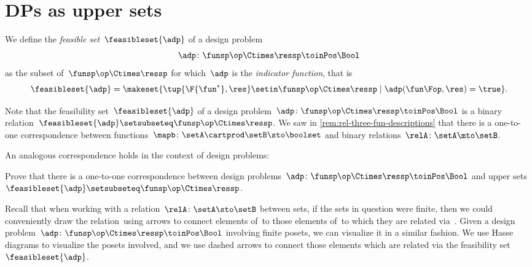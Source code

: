 \section{DPs as upper sets}

\begin{definition}
    \label{def:dp-feasible-set}
    We define the \emph{feasible set}~$\feasibleset{\adp}$ of a design problem
    \begin{equation}
        \label{eq:generic-design-prob}
        \adp\colon \funsp\op \Ctimes \ressp \toinPos \Bool
    \end{equation}
    as the subset of~$\funsp \op\Ctimes \ressp$ for which~$\adp$ is the \emph{indicator function}, that is%
    \begin{equation}
        \label{eq:design-prob-as-upper-set}
        \feasibleset{\adp} = \makeset{ \tup{\F{\fun^*},\res} \setin \funsp \op\Ctimes \ressp  \mid %
            \adp(\fun\Fop, \res) = \true %
        }.
    \end{equation}
\end{definition}

Note that the feasibility set~$\feasibleset{\adp}$ of a design problem~$\adp \colon \funsp \op \Ctimes \ressp\toinPos \Bool$ is a binary relation~$\feasibleset{\adp} \setsubseteq \funsp\op \Ctimes \ressp$.
We saw in \cref{rem:rel-three-fun-descriptions} that there is a one-to-one correspondence between functions~$\mapb \colon \setA \cartprod \setB \sto \boolset$ and binary relations~$\relA\colon \setA \mto \setB$.

An analogous correspondence holds in the context of design problems:

\begin{exercise}
    \label{ex:adp-uppersets}
    Prove that there is a one-to-one correspondence between design problems~$\adp \colon \funsp \op \Ctimes \ressp\toinPos \Bool$ and upper sets~$\feasibleset{\adp} \setsubseteq \funsp\op \Ctimes \ressp$.
\end{exercise}
\begin{solution}
    \missingsolution
\end{solution}

Recall that when working with a relation~$\relA \colon \setA \sto \setB$ between sets, if the sets in question were finite, then we could conveniently draw the relation~\relA using arrows to connect elements of~\setA to those elements of~\setB to which they are related via~\relA.
Given a design problem~$\adp \colon \funsp \op \Ctimes \ressp\toinPos \Bool$ involving finite posets, we can visualize it in a similar fashion.
We use Hasse diagrams to visualize the posets involved, and we use dashed arrows to connect those elements which are related via the feasibility set~$\feasibleset{\adp}$.

